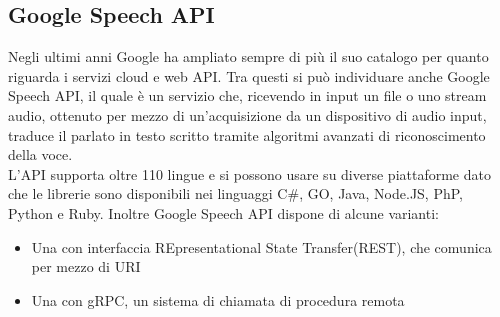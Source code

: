 \subsection{Google Speech API}
Negli ultimi anni Google ha ampliato sempre di pi\`u il suo catalogo per quanto riguarda
i servizi cloud e web API.
Tra questi si pu\`o individuare anche Google Speech API, il quale \`e un
servizio che, ricevendo in input un file o uno stream audio, ottenuto per mezzo di un'acquisizione
da un dispositivo di audio input, traduce il parlato in testo scritto tramite algoritmi avanzati
di riconoscimento della voce.\\
L'API supporta oltre 110 lingue e si possono usare su diverse piattaforme dato che
le librerie sono disponibili nei linguaggi C\#, GO, Java, Node.JS, PhP, Python e Ruby.
Inoltre Google Speech API dispone di alcune varianti:
\begin{itemize}
\item Una con interfaccia REpresentational State Transfer(REST), che comunica per mezzo di URI
\item Una con gRPC, un sistema di chiamata di procedura remota
\end{itemize}

\iffalse
\section{Model-View-Design}
Il Model-View-Design (MVC) \`e un pattern architetturale che suddivide lo sviluppo di un'applicazione web in 3 parti:
\begin{itemize}
\item Model(Modello), sono oggetti che rappresentano lo stato dell'applicazione e operazioni logiche da eseguire sul primo. Di solito
lo stato del modello viene estratto, manipolato per mezzo di operazioni e salvato da un database con cui comunicano,
oppure passato al controller.
\item Controller, \`e un'interfaccia che comunica tra il Model, la View e l'Utente. Il suo compito \`e di gestire le richieste dell'utente,
il quale comunica tramite input ed interazioni, utilizzando il modello che rientra nel dominio
dei dati inerente alla richiesta e selezionando una View per il rendering dell'interfaccia utente.
\item View(Visualizzazione), ha il compito di far visualizzare all'utente i dati estratti tramite un'interfaccia grafica, che viene creata
partendo da un modello HTML.\\[2\baselineskip]
\end{itemize}
\begin{figure}[H]
    \texttt{[image: mvc]}
    \caption{MVC Pattern}
\end{figure}
\fi

